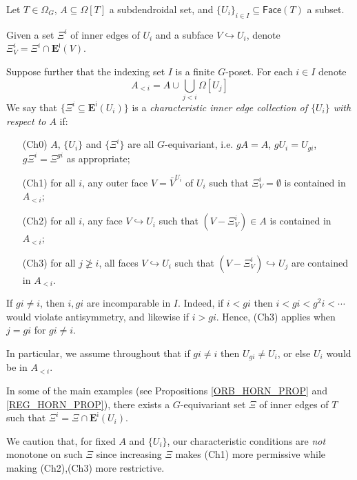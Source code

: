 \documentclass[a4paper,10pt
,draft
]{article}%
\begin{document}
\begin{definition}\label{CHAREDGE DEF}
	Let $T \in \Omega_G$, $A \subseteq \Omega[T]$ a subdendroidal set, and $\{U_i\}_{i \in I} \subseteq \mathsf{Face}(T)$ a subset.

	Given a set $\Xi^i$ of inner edges of $U_i$ and a subface $V \hookrightarrow U_i$, denote $\Xi_V^i = \Xi^i \cap \boldsymbol{E}^{\mathsf{i}}(V)$.

	Suppose further that the indexing set $I$ is a 
	finite $G$-poset. For each $i \in I$ denote
\[
	A_{<i} = A \cup \bigcup_{j<i} \Omega[U_j]
\]
	We say that $\{\Xi^i \subseteq \boldsymbol{E}^{\mathsf{i}}(U_i)\}$
	is a \textit{characteristic inner edge collection of $\{U_i\}$ with respect to $A$} if:
	\begin{itemize}
	\item[(Ch0)] $A$, $\{U_i\}$ and $\{\Xi^i\}$ are all $G$-equivariant, i.e. $g A = A$, $g U_i = U_{gi}$, $g \Xi^i = \Xi^{gi}$ as appropriate; 
	\item[(Ch1)] for all $i$, any outer face $V = \bar{V}^{U_i}$
		of $U_i$ such that $\Xi_{V}^i = \emptyset$
		is contained in $A_{<i}$;
	\item[(Ch2)] for all $i$, any face
		$V \hookrightarrow U_i$ such that $(V-\Xi_V^i) \in A$
		is contained in $A_{<i}$;
	\item[(Ch3)] for all $j \not \geq i$, 
		all faces $V \hookrightarrow U_i$ such that 
		$(V-\Xi^i_V) \hookrightarrow U_j$
		are contained in $A_{<i}$.
	\end{itemize}
\end{definition}


\begin{remark}\label{XIIII REM}
If $g i \neq i$, then $i,g i$ are incomparable in $I$. Indeed, if $i<gi$ then $i<gi<g^2i<\cdots$ would violate antisymmetry, and likewise if $i>gi$.
Hence, (Ch3) applies when $j=gi$ for $gi\neq i$.

In particular, we assume throughout that if
$gi \neq i$ then $U_{gi} \neq U_i$,
or else $U_i$ would be in $A_{<i}$.
\end{remark}


\begin{remark}\label{SOMEMAIN REM}
In some of the main examples (see Propositions \ref{ORB_HORN_PROP} and \ref{REG_HORN_PROP}), there exists a $G$-equivariant set 
$\Xi$ of inner edges of $T$ such that $\Xi^i = \Xi \cap \boldsymbol{E}^{\mathsf{i}}(U_i)$.
	
We caution that, for fixed $A$ and $\{U_i\}$, our characteristic conditions are \textit{not} monotone on such $\Xi$ since increasing $\Xi$ makes (Ch1) more permissive while making (Ch2),(Ch3) more restrictive.
\end{remark}
\end{document}
